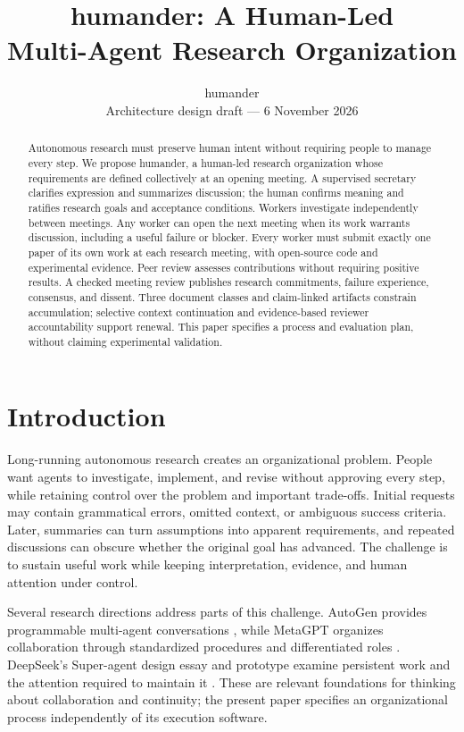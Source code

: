 \documentclass[11pt]{article}
\title{humander: A Human-Led\\Multi-Agent Research Organization}
\author{humander\\Architecture design draft --- 6 November 2026}
\date{}
\begin{document}
\maketitle

\begin{abstract}
Autonomous research must preserve human intent without requiring people to manage every step. We propose humander, a human-led research organization whose requirements are defined collectively at an opening meeting. A supervised secretary clarifies expression and summarizes discussion; the human confirms meaning and ratifies research goals and acceptance conditions. Workers investigate independently between meetings. Any worker can open the next meeting when its work warrants discussion, including a useful failure or blocker. Every worker must submit exactly one paper of its own work at each research meeting, with open-source code and experimental evidence. Peer review assesses contributions without requiring positive results. A checked meeting review publishes research commitments, failure experience, consensus, and dissent. Three document classes and claim-linked artifacts constrain accumulation; selective context continuation and evidence-based reviewer accountability support renewal. This paper specifies a process and evaluation plan, without claiming experimental validation.

\end{abstract}

\section{Introduction}

Long-running autonomous research creates an organizational problem. People want agents to investigate, implement, and revise without approving every step, while retaining control over the problem and important trade-offs. Initial requests may contain grammatical errors, omitted context, or ambiguous success criteria. Later, summaries can turn assumptions into apparent requirements, and repeated discussions can obscure whether the original goal has advanced. The challenge is to sustain useful work while keeping interpretation, evidence, and human attention under control.

Several research directions address parts of this challenge. AutoGen provides programmable multi-agent conversations \citep{wu2023autogen}, while MetaGPT organizes collaboration through standardized procedures and differentiated roles \citep{hong2023metagpt}. DeepSeek's Super-agent design essay and prototype examine persistent work and the attention required to maintain it \citep{deepseek2026article,deepseek2026prototype}. These are relevant foundations for thinking about collaboration and continuity; the present paper specifies an organizational process independently of its execution software.
\end{document}
